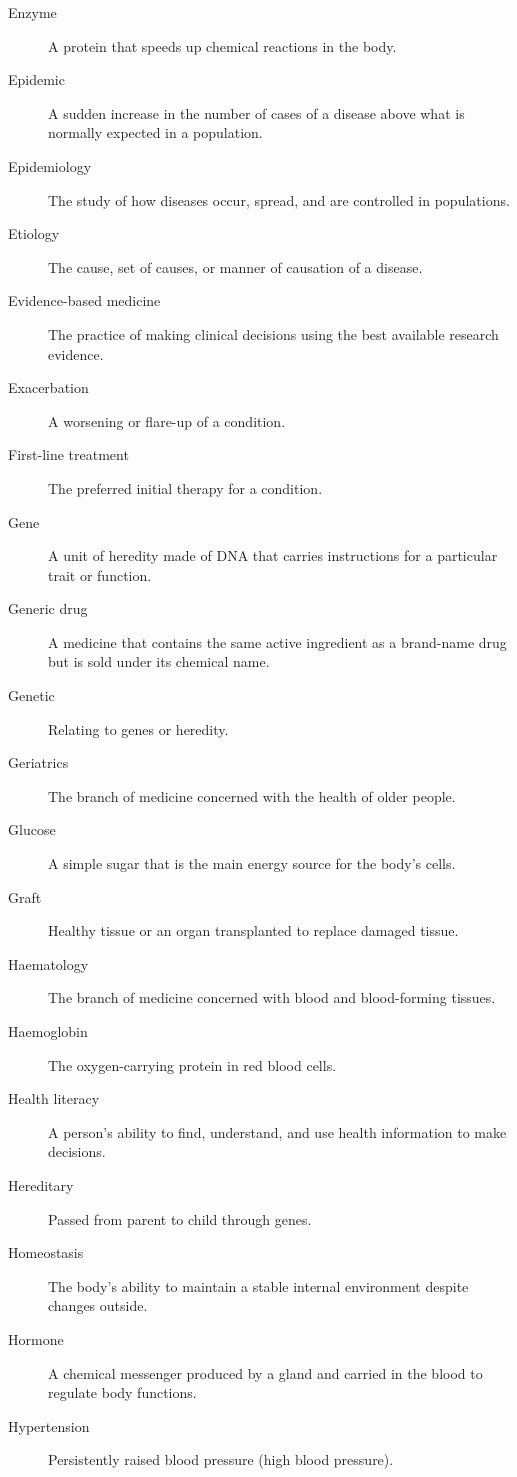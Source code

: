 \documentclass[12pt,oneside]{book}
\begin{document}
\begin{description}
  \item[Enzyme] A protein that speeds up chemical reactions in the body.
  \item[Epidemic] A sudden increase in the number of cases of a disease above what is normally expected in a population.
  \item[Epidemiology] The study of how diseases occur, spread, and are controlled in populations.
  \item[Etiology] The cause, set of causes, or manner of causation of a disease.
  \item[Evidence-based medicine] The practice of making clinical decisions using the best available research evidence.
  \item[Exacerbation] A worsening or flare-up of a condition.
  \item[First-line treatment] The preferred initial therapy for a condition.
  \item[Gene] A unit of heredity made of DNA that carries instructions for a particular trait or function.
  \item[Generic drug] A medicine that contains the same active ingredient as a brand-name drug but is sold under its chemical name.
  \item[Genetic] Relating to genes or heredity.
  \item[Geriatrics] The branch of medicine concerned with the health of older people.
  \item[Glucose] A simple sugar that is the main energy source for the body's cells.
  \item[Graft] Healthy tissue or an organ transplanted to replace damaged tissue.
  \item[Haematology] The branch of medicine concerned with blood and blood-forming tissues.
  \item[Haemoglobin] The oxygen-carrying protein in red blood cells.
  \item[Health literacy] A person's ability to find, understand, and use health information to make decisions.
  \item[Hereditary] Passed from parent to child through genes.
  \item[Homeostasis] The body's ability to maintain a stable internal environment despite changes outside.
  \item[Hormone] A chemical messenger produced by a gland and carried in the blood to regulate body functions.
  \item[Hypertension] Persistently raised blood pressure (high blood pressure).

\end{description}
\end{document}
